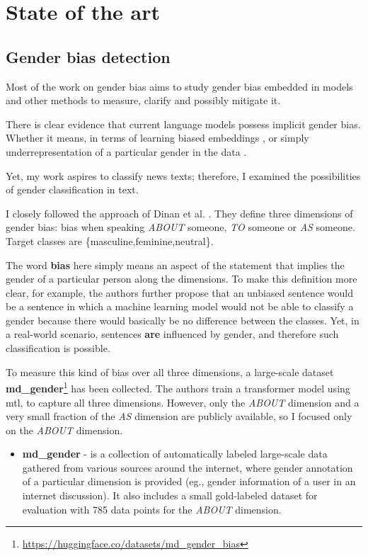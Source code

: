 \chapter{State of the art}

\section{Gender bias detection}\label{gender}
Most of the work on gender bias aims to study gender bias embedded in models and other methods to measure, clarify and possibly mitigate it.

There is clear evidence that current language models possess implicit gender bias. Whether it means, in terms of learning biased embeddings \cite{bolukbasi2016man}, or simply underrepresentation of a particular gender in the data \cite{sun-peng-2021-men}. 

Yet, my work aspires to classify news texts; therefore, I examined the possibilities of gender classification in text.

I closely followed the approach of Dinan et al. \cite{dinan2020multi}. They define three dimensions of gender bias: bias when speaking \textit{ABOUT} someone, \textit{TO} someone or \textit{AS} someone. Target classes are \{masculine,feminine,neutral\}. 

The word \textbf{bias} here simply means an aspect of the statement that implies the gender of a particular person along the dimensions. To make this definition more clear, for example, the authors further propose that an unbiased sentence would be a sentence in which a machine learning model would not be able to classify a gender because there would basically be no difference between the classes. Yet, in a real-world scenario, sentences \textbf{are} influenced by gender, and therefore such classification is possible.

To measure this kind of bias over all three dimensions, a large-scale dataset \textbf{md\_gender}\footnote{\url{https://huggingface.co/datasets/md_gender_bias}} has been collected. The authors train a transformer model using \Gls{mtl}, to capture all three dimensions. However, only the \textit{ABOUT} dimension and a very small fraction of the \textit{AS} dimension are publicly available, so I focused only on the \textit{ABOUT} dimension.

\begin{itemize}
\item \textbf{md\_gender} - is a collection of automatically labeled large-scale data gathered from various sources around the internet, where gender annotation of a particular dimension is provided (eg., gender information of a user in an internet discussion). It also includes a small gold-labeled dataset for evaluation with 785 data points for the \textit{ABOUT} dimension.
\end{itemize}

